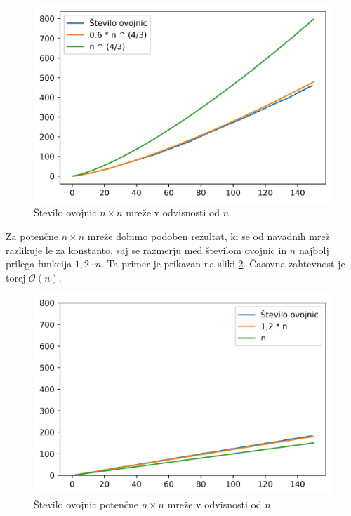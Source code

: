 \documentclass[a4paper]{article}
\begin{document}
\begin{figure}[!h]
	\centering
	\caption{Število ovojnic $n \times n$ mreže v odvisnosti od $n$}
	\label{fig:st_ovojnic}
	\vspace{2mm}
	\includegraphics[scale=0.6]{st_ovojnic.jpg}
\end{figure}

Za potenčne $n \times n$ mreže dobimo podoben rezultat, ki se od navadnih mrež razlikuje le za konstanto, saj se razmerju med številom ovojnic in $n$ najbolj prilega funkcija
$1,2 \cdot n$. Ta primer je prikazan na sliki \ref{fig:st_ovojnic_potencna}. Časovna zahtevnost je torej $\mathcal{O}(n)$.

\begin{figure}[!h]
	\centering
	\caption{Število ovojnic potenčne $n \times n$ mreže v odvisnosti od $n$}
	\label{fig:st_ovojnic_potencna}
	\vspace{2mm}
	\includegraphics[scale=0.6]{st_ovojnic_potencna.jpg}
\end{figure}
\end{document}
